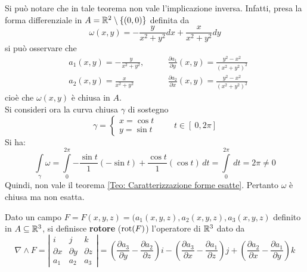 \begin{example}
    Si può notare che in tale teorema non vale l'implicazione inversa. Infatti, presa la forma differenziale in $A=\mathbb{R}^2\setminus \left\{ (0,0)\right\} $ definita da
    \begin{equation*}
        \omega(x,y)= - \frac{y}{x^2+y^2}dx+ \frac{x}{x^2+y^2}dy
    \end{equation*}
    si può osservare che
    \begin{equation*}
        \begin{aligned}
            &a_1(x, y)= - \frac{y}{x^2+y^2}, \qquad &\frac{\partial a_1}{\partial y} (x, y) = \frac{y^2-x^2}{\left(x^2+y^2 \right)^2} \\
            &a_2(x,y)= \frac{x}{x^2+y^2} \qquad &\frac{\partial a_2}{\partial x} (x, y) = \frac{y^2-x^2}{\left(x^2+y^2 \right)^2}
        \end{aligned}
    \end{equation*}
    cioè che $\omega(x,y)$ è chiusa in $A$.\\
    Si consideri ora la curva chiusa $\gamma$ di sostegno
    \begin{equation*}
        \gamma= \begin{cases}
            x= \cos t\\
            y= \sin t
        \end{cases}
        \qquad t \in \left[\ 0, 2 \pi \right]
    \end{equation*}
    Si ha:
    \begin{equation*}
    \int\limits_{\gamma}{\omega}= \int\limits_{0}^{2\pi}{- \frac{\sin t}{1} (-\sin t) + \frac{\cos t}{1} (\cos t)}\, dt = \int\limits_{0}^{2\pi}{\,dt}= 2\pi \neq 0
    \end{equation*}
    Quindi, non vale il teorema \ref{Teo: Caratterizzazione forme esatte}. Pertanto $\omega$ è chiusa ma non esatta.
\end{example}
\begin{definition} \label{Def: Rotore}
Dato un campo $F= F(x,y,z)= (a_1(x,y,z), a_2(x,y,z), a_3(x,y,z)$ definito in $A \subseteq \mathbb{R}^3$, si definisce \textbf{rotore} ($\operatorname{rot}(F)$) l'operatore di $\mathbb{R}^3$ dato da
\begin{equation}
\nabla \wedge F = \left| \begin{matrix}
    i & j & k \\
    \partial x & \partial y & \partial z\\
    a_1 & a_2 & a_3
\end{matrix}
\right|
= \left( \frac{\partial a_3}{\partial y} - \frac{\partial a_2}{\partial z} \right)i - \left( \frac{\partial a_3}{\partial x} - \frac{\partial a_1}{\partial z} \right)j + \left( \frac{\partial a_2}{\partial x} - \frac{\partial a_1}{\partial y}\right)k 
\end{equation}
\end{definition}
